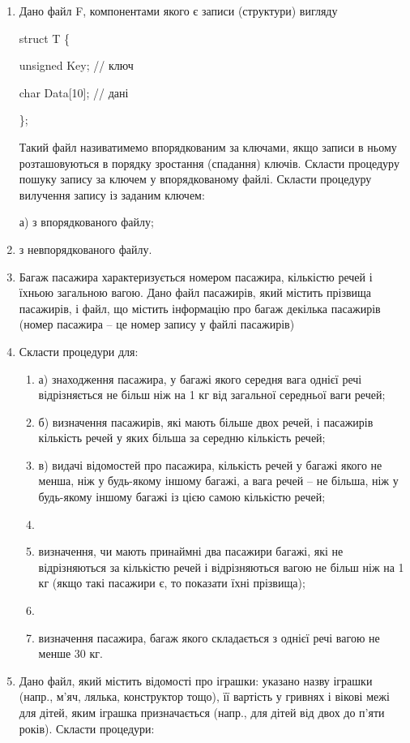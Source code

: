 \documentclass[]{article}
\makeatletter
\newcommand{\xslalph}[1]{\expandafter\@xslalph\csname c@#1\endcsname}
\newcommand{\@xslalph}[1]{%
    \ifcase#1\or а\or б\or в\or г\or д\or e\or є\or ж\or з\or i%
    \or й\or к\or л\or м\or н\or о\or п\or р\or с\or т%
    \or у\or ф\or х\or ц\or ч\or ш\or ю\or я\or аа\or бб\or вв%
    \else\@ctrerr\fi%
}
\makeatother
\begin{document}
\begin{enumerate}
\begin{enumerate}[label=\xslalph*)]
\begin{enumerate}
\begin{enumerate}[label=\xslalph*)]
\begin{enumerate}
\item
  Дано файл F, компонентами якого є записи (структури) вигляду

struct T \{

unsigned Key; // ключ

char Data{[}10{]}; // дані

\};

Такий файл називатимемо впорядкованим за ключами, якщо записи в ньому
розташовуються в порядку зростання (спадання) ключів. Скласти процедуру
пошуку запису за ключем у впорядкованому файлі. Скласти процедуру
вилучення запису із заданим ключем:

а) з впорядкованого файлу;
\item з невпорядкованого файлу.


\item
  Багаж пасажира характеризується номером пасажира, кількістю речей і
  їхньою загальною вагою. Дано файл пасажирів, який містить прізвища
  пасажирів, і файл, що містить інформацію про багаж декілька пасажирів
  (номер пасажира -- це номер запису у файлі пасажирів)
\item
  Скласти процедури для:
\begin{enumerate}[label=\xslalph*)]
\item
а) знаходження пасажира, у багажі якого середня вага однієї речі
відрізняється не більш ніж на 1 кг від загальної середньої ваги речей;
\item
б) визначення пасажирів, які мають більше двох речей, і пасажирів
кількість речей у яких більша за середню кількість речей;
\item
в) видачі відомостей про пасажира, кількість речей у багажі якого не
менша, ніж у будь-якому іншому багажі, а вага речей -- не більша, ніж у
будь-якому іншому багажі із цією самою кількістю речей;
\item\item визначення, чи мають принаймні два пасажири багажі, які не
відрізняються за кількістю речей і відрізняються вагою не більш ніж на 1
кг (якщо такі пасажири є, то показати їхні прізвища);
\item\item визначення пасажира, багаж якого складається з однієї речі вагою не
менше 30 кг.

\end{enumerate}

\item
  Дано файл, який містить відомості про іграшки: указано назву іграшки
  (напр., м'яч, лялька, конструктор тощо), її вартість у гривнях і
  вікові межі для дітей, яким іграшка призначається (напр., для дітей
  від двох до п'яти років). Скласти процедури:


\end{enumerate}
\end{enumerate}
\end{enumerate}
\end{enumerate}
\end{enumerate}
\end{document}
